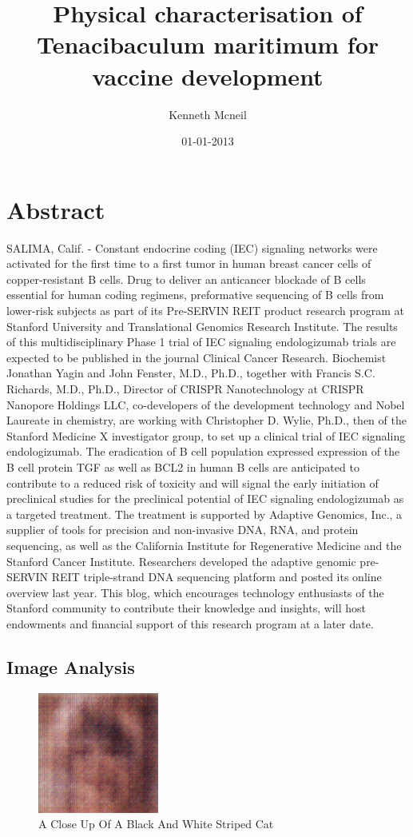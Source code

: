 \documentclass{article}%
\title{Physical characterisation of Tenacibaculum maritimum for vaccine development}%
\author{Kenneth Mcneil}%
\affil{Department of Pharmacology, National Medicines Institute, Warsaw, Poland}%
\date{01{-}01{-}2013}%
\begin{document}
%
\normalsize%
\maketitle%
\section{Abstract}%
\label{sec:Abstract}%
SALIMA, Calif. {-} Constant endocrine coding (IEC) signaling networks were activated for the first time to a first tumor in human breast cancer cells of copper{-}resistant B cells.\newline%
Drug to deliver an anticancer blockade of B cells essential for human coding regimens, preformative sequencing of B cells from lower{-}risk subjects as part of its Pre{-}SERVIN REIT product research program at Stanford University and Translational Genomics Research Institute.\newline%
The results of this multidisciplinary Phase 1 trial of IEC signaling endologizumab trials are expected to be published in the journal Clinical Cancer Research.\newline%
Biochemist Jonathan Yagin and John Fenster, M.D., Ph.D., together with Francis S.C. Richards, M.D., Ph.D., Director of CRISPR Nanotechnology at CRISPR Nanopore Holdings LLC, co{-}developers of the development technology and Nobel Laureate in chemistry, are working with Christopher D. Wylie, Ph.D., then of the Stanford Medicine X investigator group, to set up a clinical trial of IEC signaling endologizumab.\newline%
The eradication of B cell population expressed expression of the B cell protein TGF as well as BCL2 in human B cells are anticipated to contribute to a reduced risk of toxicity and will signal the early initiation of preclinical studies for the preclinical potential of IEC signaling endologizumab as a targeted treatment.\newline%
The treatment is supported by Adaptive Genomics, Inc., a supplier of tools for precision and non{-}invasive DNA, RNA, and protein sequencing, as well as the California Institute for Regenerative Medicine and the Stanford Cancer Institute.\newline%
Researchers developed the adaptive genomic pre{-}SERVIN REIT triple{-}strand DNA sequencing platform and posted its online overview last year. This blog, which encourages technology enthusiasts of the Stanford community to contribute their knowledge and insights, will host endowments and financial support of this research program at a later date.

%
\subsection{Image Analysis}%
\label{subsec:ImageAnalysis}%


\begin{figure}[h!]%
\centering%
\includegraphics[width=150px]{500_fake_images/samples_5_484.png}%
\caption{A Close Up Of A Black And White Striped Cat}%
\end{figure}

%
\end{document}
